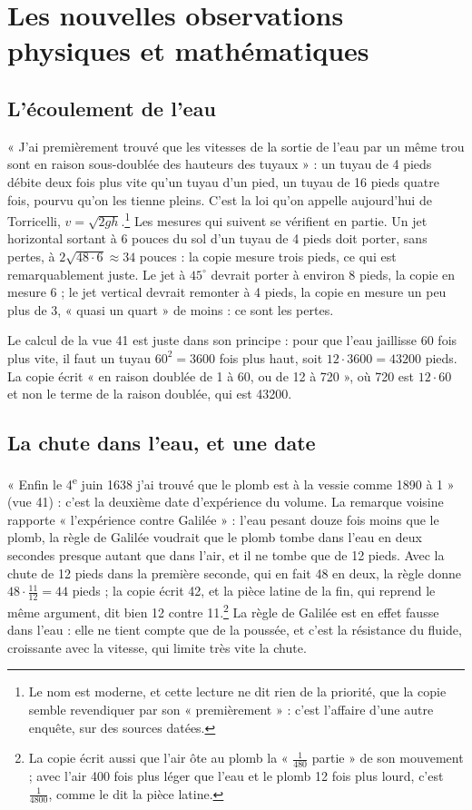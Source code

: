 \documentclass[11pt,a4paper]{article}
\begin{document}
\section*{Les nouvelles observations physiques et mathématiques}

\subsection*{L'écoulement de l'eau}

« J'ai premièrement trouvé que les vitesses de la sortie de l'eau par un même
trou sont en raison sous-doublée des hauteurs des tuyaux » : un tuyau de 4 pieds
débite deux fois plus vite qu'un tuyau d'un pied, un tuyau de 16 pieds quatre
fois, pourvu qu'on les tienne pleins. C'est la loi qu'on appelle aujourd'hui
de Torricelli, $v = \sqrt{2gh}$.\footnote{Le nom est moderne, et cette lecture ne
dit rien de la priorité, que la copie semble revendiquer par son
« premièrement » : c'est l'affaire d'une autre enquête, sur des sources datées.}
Les mesures qui suivent se vérifient en partie. Un jet horizontal sortant à 6
pouces du sol d'un tuyau de 4 pieds doit porter, sans pertes, à
$2\sqrt{48 \cdot 6} \approx 34$ pouces : la copie mesure trois pieds, ce qui est
remarquablement juste. Le jet à $45^\circ$ devrait porter à environ 8 pieds, la
copie en mesure 6 ; le jet vertical devrait remonter à 4 pieds, la copie en
mesure un peu plus de 3, « quasi un quart » de moins : ce sont les pertes.

Le calcul de la vue 41 est juste dans son principe : pour que l'eau jaillisse
60 fois plus vite, il faut un tuyau $60^2 = 3600$ fois plus haut, soit
$12 \cdot 3600 = 43200$ pieds. La copie écrit « en raison doublée de 1 à 60, ou
de 12 à 720 », où 720 est $12 \cdot 60$ et non le terme de la raison doublée,
qui est 43200.

\subsection*{La chute dans l'eau, et une date}

« Enfin le 4\textsuperscript{e} juin 1638 j'ai trouvé que le plomb est à la vessie
comme 1890 à 1 » (vue 41) : c'est la deuxième date d'expérience du volume. La
remarque voisine rapporte « l'expérience contre Galilée » : l'eau pesant douze
fois moins que le plomb, la règle de Galilée voudrait que le plomb tombe dans
l'eau en deux secondes presque autant que dans l'air, et il ne tombe que de 12
pieds. Avec la chute de 12 pieds dans la première seconde, qui en fait 48 en
deux, la règle donne $48 \cdot \frac{11}{12} = 44$ pieds ; la copie écrit 42, et
la pièce latine de la fin, qui reprend le même argument, dit bien 12 contre
11.\footnote{La copie écrit aussi que l'air ôte au plomb la
« $\frac{1}{480}$ partie » de son mouvement ; avec l'air 400 fois plus léger que
l'eau et le plomb 12 fois plus lourd, c'est $\frac{1}{4800}$, comme le dit la
pièce latine.} La règle de Galilée est en effet fausse dans l'eau : elle ne
tient compte que de la poussée, et c'est la résistance du fluide, croissante
avec la vitesse, qui limite très vite la chute.
\end{document}
